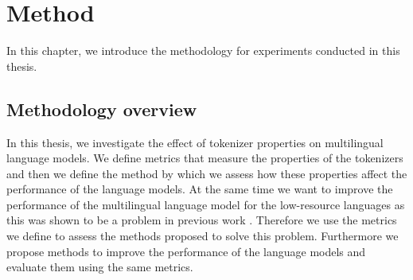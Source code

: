 \chapter{Method}
\label{chap:method}


In this chapter, we introduce the methodology for experiments conducted in this thesis.

\section{Methodology overview}



In this thesis, we investigate the effect of tokenizer properties on multilingual language models. We define metrics that measure the properties of the tokenizers and then we define the method by which we assess how these properties affect the performance of the language models. At the same time we want to improve the performance of the multilingual language model for the low-resource languages as this was shown to be a problem in previous work \cite{rust_how_2021}. Therefore we use the metrics we define to assess the methods proposed to solve this problem. Furthermore we propose methods to improve the performance of the language models and evaluate them using the same metrics.



